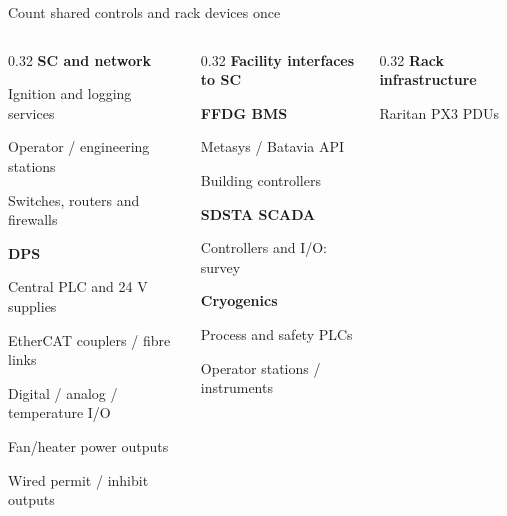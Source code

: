 \begin{frame}{Count shared controls and rack devices once}
\small
\begin{columns}[T,onlytextwidth]
\begin{column}{0.32\textwidth}
\textbf{SC and network}\par
\hspace*{0.8em}Ignition and logging services\par
\hspace*{0.8em}Operator / engineering stations\par
\hspace*{0.8em}Switches, routers and firewalls\par\bigskip
\textbf{DPS}\par
\hspace*{0.8em}Central PLC and 24 V supplies\par
\hspace*{0.8em}EtherCAT couplers / fibre links\par
\hspace*{0.8em}Digital / analog / temperature I/O\par
\hspace*{0.8em}Fan/heater power outputs\par
\hspace*{0.8em}Wired permit / inhibit outputs
\end{column}
\begin{column}{0.32\textwidth}
\textbf{Facility interfaces to SC}\par\medskip
\textbf{FFDG BMS}\par
\hspace*{0.8em}Metasys / Batavia API\par
\hspace*{0.8em}Building controllers\par\medskip
\textbf{SDSTA SCADA}\par
\hspace*{0.8em}Controllers and I/O: survey\par\medskip
\textbf{Cryogenics}\par
\hspace*{0.8em}Process and safety PLCs\par
\hspace*{0.8em}Operator stations / instruments
\end{column}
\begin{column}{0.32\textwidth}
\textbf{Rack infrastructure}\par
\hspace*{0.8em}Raritan PX3 PDUs\par

\end{column}
\end{columns}
\end{frame}
